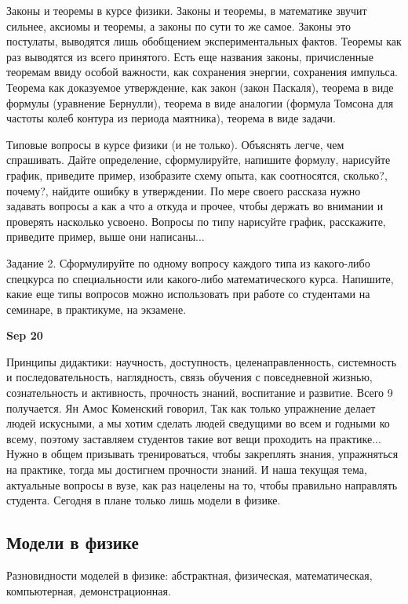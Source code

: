 \documentclass[a4paper, 12pt]{article}
\begin{document}
Законы и теоремы в курсе физики. Законы и теоремы, в математике звучит 
сильнее, аксиомы и теоремы, а законы по сути то же самое. Законы это 
постулаты, выводятся лишь обобщением экспериментальных фактов. Теоремы 
как раз выводятся из всего принятого. Есть еще названия законы, 
причисленные теоремам ввиду особой важности, как сохранения энергии, 
сохранения импульса. Теорема как доказуемое утверждение, как закон 
(закон Паскаля), теорема в виде формулы (уравнение Бернулли), теорема 
в виде аналогии (формула Томсона для частоты колеб контура из периода 
маятника), теорема в виде задачи.

Типовые вопросы в курсе физики (и не только). Объяснять легче, чем 
спрашивать. Дайте определение, сформулируйте, напишите формулу, 
нарисуйте график, приведите пример, изобразите схему опыта, как 
соотносятся, сколько?, почему?, найдите ошибку в утверждении. По мере 
своего рассказа нужно задавать вопросы а как а что а откуда и прочее, 
чтобы держать во внимании и проверять насколько усвоено. Вопросы по типу 
нарисуйте график, расскажите, приведите пример, выше они написаны...

Задание 2. Сформулируйте по одному вопросу каждого типа из какого-либо 
спецкурса по специальности или какого-либо математического курса. 
Напишите, какие еще типы вопросов можно использовать при работе со 
студентами на семинаре, в практикуме, на экзамене.

\hfill \textbf{Sep 20}

Принципы дидактики: научность, доступность, целенаправленность, 
системность и последовательность, наглядность, связь обучения 
с повседневной жизнью, сознательность и активность, прочность знаний, 
воспитание и развитие. Всего 9 получается. Ян Амос Коменский говорил, 
Так как только упражнение делает людей искусными, а мы хотим сделать 
людей сведущими во всем и годными ко всему, поэтому заставляем студентов 
такие вот вещи проходить на практике... Нужно в общем призывать 
тренироваться, чтобы закреплять знания, упражняться на практике, тогда 
мы достигнем прочности знаний. И наша текущая тема, актуальные вопросы 
в вузе, как раз нацелены на то, чтобы правильно направлять студента. 
Сегодня в плане только лишь модели в физике.

\subsection{Модели в физике}

Разновидности моделей в физике: абстрактная, физическая, математическая, 
компьютерная, демонстрационная.
\end{document}
